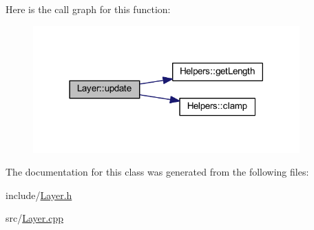 Here is the call graph for this function\+:
\nopagebreak
\begin{figure}[H]
\begin{center}
\leavevmode
\includegraphics[width=290pt]{class_layer_afe3b5bbec379d4ea687df300c4176ae4_cgraph}
\end{center}
\end{figure}


The documentation for this class was generated from the following files\+:\begin{DoxyCompactItemize}
\item 
include/\hyperlink{_layer_8h}{Layer.\+h}\item 
src/\hyperlink{_layer_8cpp}{Layer.\+cpp}\end{DoxyCompactItemize}
